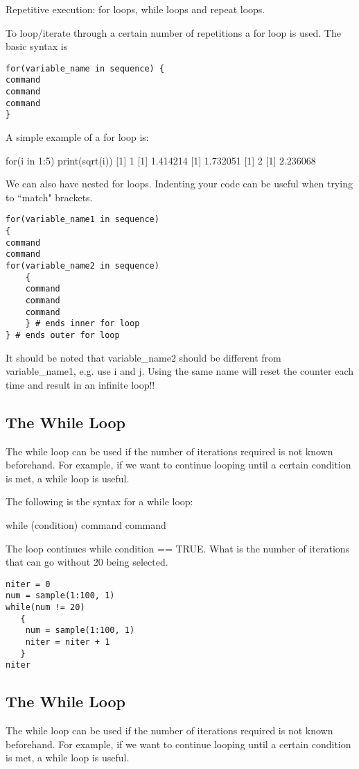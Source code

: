 Repetitive execution: for loops, while loops and repeat loops.

To loop/iterate through a certain number of repetitions a for loop
is used. The basic syntax is
\begin{verbatim}
for(variable_name in sequence) {
command
command
command
}
\end{verbatim}

A simple example of a for loop is:

for(i in 1:5){
print(sqrt(i))
}
[1] 1
[1] 1.414214
[1] 1.732051
[1] 2
[1] 2.236068


We can also have nested for loops. Indenting your code can be useful
when trying to “match" brackets.
\begin{verbatim}
for(variable_name1 in sequence) 
{
command
command
for(variable_name2 in sequence)
    {
    command
    command 
    command
    } # ends inner for loop
} # ends outer for loop
\end{verbatim}
It should be noted that variable_name2 should be different from
variable_name1, e.g. use i and j. Using the same name will
reset the counter each time and result in an infinite loop!!



\subsection{The While Loop}
The while loop can be used if the number of iterations required is not known beforehand. For example, if we want to continue looping until a certain condition is met, a while loop is useful.

The following is the syntax for a while loop:

while (condition){
command
command
}

The loop continues while condition == TRUE.
What is the number of iterations that can go without 20 being selected.

\begin{verbatim}
niter = 0		
num = sample(1:100, 1)
while(num != 20) 
   {
    num = sample(1:100, 1)
    niter = niter + 1
   }
niter
\end{verbatim}

\subsection{The While Loop}
The while loop can be used if the number of iterations required is not known beforehand. For example, if we want to continue looping until a certain condition is met, a while loop is useful.

